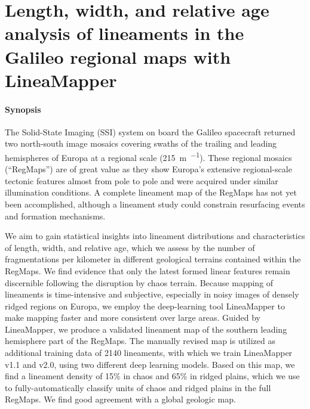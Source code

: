 \graphicspath{{appendices/}{regional_mosaics/}{Figures/}}

\chapter[LineaMapper on Galileo RegMaps]{Length, width, and relative age analysis of lineaments in the Galileo regional maps with LineaMapper}
\label{chapter:regional_mosaics}


\subsubsection{Synopsis}The Solid-State Imaging (SSI) system on board the Galileo spacecraft returned two north-south image mosaics covering swaths of the trailing and leading hemispheres of Europa at a regional scale (\qty{215}{\m~\px^{-1}}). These regional mosaics (``RegMaps'') are of great value as they show Europa’s extensive regional-scale tectonic features almost from pole to pole and were acquired under similar illumination conditions. A complete lineament map of the RegMaps has not yet been accomplished, although a lineament study could constrain resurfacing events and formation mechanisms.

We aim to gain statistical insights into lineament distributions and characteristics of length, width, and relative age, which we assess by the number of fragmentations per kilometer in different geological terrains contained within the RegMaps. We find evidence that only the latest formed linear features remain discernible following the disruption by chaos terrain. Because mapping of lineaments is time-intensive and subjective, especially in noisy images of densely ridged regions on Europa, we employ the deep-learning tool LineaMapper to make mapping faster and more consistent over large areas. Guided by LineaMapper, we produce a validated lineament map of the southern leading hemisphere part of the RegMaps. %
The manually revised map is utilized as additional training data of 2140 lineaments, with which we train LineaMapper v1.1 and v2.0, using two different deep learning models. 
Based on this map, we find a lineament density of 15\% in chaos and 65\% in ridged plains, which we use to fully-automatically classify units of chaos and ridged plains in the full RegMaps. We find good agreement with a global geologic map.


